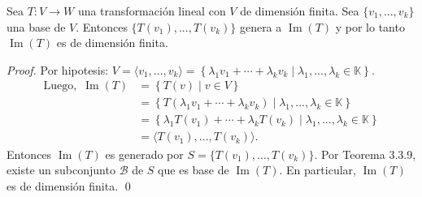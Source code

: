 \documentclass[handout]{beamer} %
\newcommand{\im}{\operatorname{Im}}
\renewcommand\nu{\operatorname{Nu}}
\newcommand{\K}{\mathbb K}
\begin{document}
\begin{frame}

    \begin{lema}
    Sea $T:V\longrightarrow W$ una transformación lineal con $V$ de dimensión finita. Sea $\{v_1, ..., v_k\}$ una base de $V$. Entonces $\{T(v_1), ..., T(v_k)\}$ genera a $\im(T)$ y por lo tanto $\im(T)$ es de dimensión finita.
    \end{lema}\pause
    \begin{proof}\pause
        Por hipotesis: $V=\langle v_1, ..., v_k\rangle=\left\{\lambda_1v_1+\cdots+\lambda_k v_k\mid \lambda_1, ..., \lambda_k\in\K\right\}$.
        \begin{align*}
        \mbox{Luego, }\,\im(T)&=\left\{T(v)\mid v\in V\right\}\\
        &=\left\{T(\lambda_1v_1+\cdots+\lambda_kv_k)\mid \lambda_1, ..., \lambda_k\in\K\right\}\\
        &=\left\{\lambda_1T(v_1)+\cdots+\lambda_kT(v_k)\mid \lambda_1, ..., \lambda_k\in\K\right\}\\
        &=\langle T(v_1), ..., T(v_k)\rangle.
        \end{align*}
        Entonces $\im(T)$ es generado por $S=\{T(v_1), ..., T(v_k)\}$. Por Teorema 3.3.9, existe un subconjunto $\mathcal B$ de $S$ que es base de $\im(T)$. En particular, $\im(T)$ es de dimensión finita. \qed     
    \end{proof}
    
    \end{frame}

\end{document}
